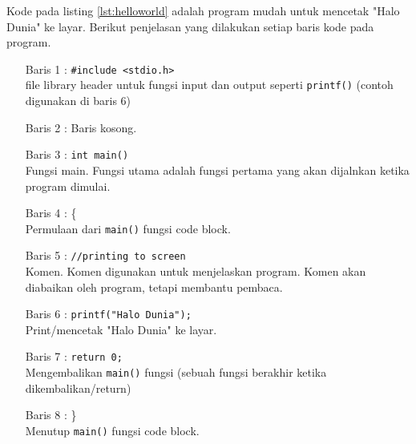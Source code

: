 Kode pada listing \ref{lst:helloworld} adalah program mudah untuk mencetak "Halo Dunia" ke layar. Berikut penjelasan yang dilakukan setiap baris kode pada program.
\begin{itemize}\setlength\itemsep{-0.1em}

	\item [Baris 1 :] \verb|#include <stdio.h>|\\ file library header untuk fungsi input dan output seperti \verb|printf()| (contoh digunakan di baris 6)
	\item[Baris 2 :] Baris kosong.
	\item [Baris 3 :] \verb|int main()|\\ Fungsi main. Fungsi utama adalah fungsi pertama yang akan dijalnkan ketika program dimulai.
	\item[Baris 4 :] \{ \\Permulaan dari \verb|main()| fungsi code block.
		\item[Baris 5 :]\verb|//printing to screen|\\ Komen. Komen digunakan untuk menjelaskan program. Komen akan diabaikan oleh program, tetapi membantu pembaca.
		\item[Baris 6 :]\verb|printf("Halo Dunia");|\\ Print/mencetak "Halo Dunia" ke layar.
	\item[Baris 7 :] \verb|return 0;| \\Mengembalikan \verb|main()| fungsi (sebuah fungsi berakhir ketika dikembalikan/return)
	\item [Baris 8 :] \}\\Menutup \verb|main()| fungsi code block.


\end{itemize}
